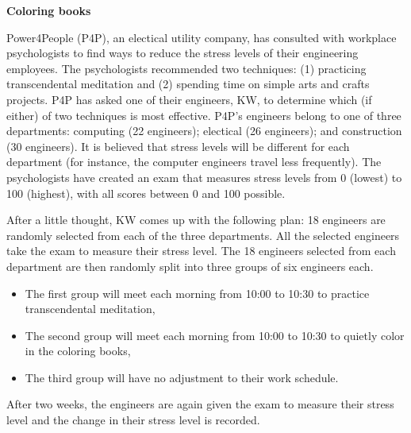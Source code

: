 \documentclass[addpoints]{examsetup}\usepackage[]{graphicx}\usepackage[]{color}
\begin{document}
\begin{questions}
\begin{parts}
\end{parts}

\newpage

\question

\textbf{Coloring books}

Power4People (P4P), an electical utility company, has consulted with workplace psychologists to find ways to reduce the stress levels of their engineering employees.
The psychologists recommended two techniques: (1) practicing transcendental meditation and (2) spending time on simple arts and crafts projects.
P4P has asked one of their engineers, KW, to determine which (if either) of two techniques is most effective.
P4P's engineers belong to one of three departments: computing (22 engineers); electical (26 engineers); and construction (30 engineers).
It is believed that stress levels will be different for each department (for instance, the computer engineers travel less frequently).
The psychologists have created an exam that measures stress levels from 0 (lowest) to 100 (highest), with all scores between 0 and 100 possible.

After a little thought, KW comes up with the following plan:
18 engineers are randomly selected from each of the three departments. 
All the selected engineers take the exam to measure their stress level.
The 18 engineers selected from each department are then randomly split into three groups of six engineers each.
\begin{itemize}
   \item The first group will meet each morning from 10:00 to 10:30 to practice transcendental meditation,
   \item The second group will meet each morning from 10:00 to 10:30 to quietly color in the coloring books,
   \item The third group will have no adjustment to their work schedule.
\end{itemize}
After two weeks, the engineers are again given the exam to measure their stress level and the change in their stress level is recorded.

\end{questions}
\end{document}
